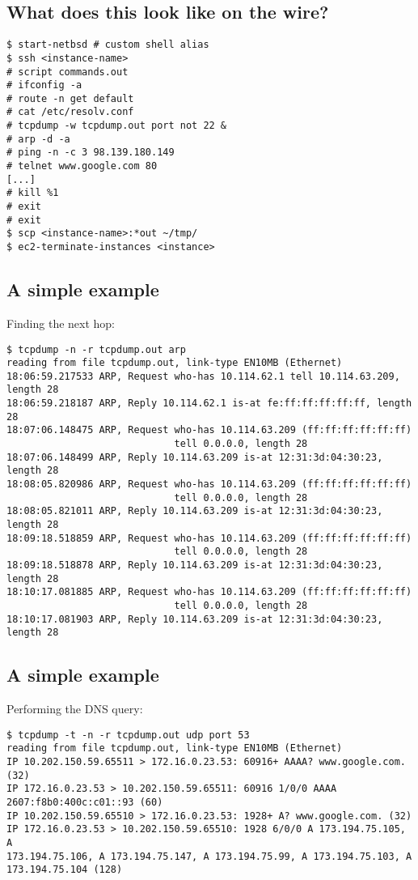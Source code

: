 \documentclass[xga]{xdvislides}
\begin{document}
\subsection{What does this look like on the wire?}
\begin{verbatim}
$ start-netbsd # custom shell alias
$ ssh <instance-name>
# script commands.out
# ifconfig -a
# route -n get default
# cat /etc/resolv.conf
# tcpdump -w tcpdump.out port not 22 &
# arp -d -a
# ping -n -c 3 98.139.180.149
# telnet www.google.com 80
[...]
# kill %1
# exit
# exit
$ scp <instance-name>:*out ~/tmp/
$ ec2-terminate-instances <instance>
\end{verbatim}

\subsection{A simple example}
Finding the next hop:
\begin{verbatim}
$ tcpdump -n -r tcpdump.out arp
reading from file tcpdump.out, link-type EN10MB (Ethernet)
18:06:59.217533 ARP, Request who-has 10.114.62.1 tell 10.114.63.209, length 28
18:06:59.218187 ARP, Reply 10.114.62.1 is-at fe:ff:ff:ff:ff:ff, length 28
18:07:06.148475 ARP, Request who-has 10.114.63.209 (ff:ff:ff:ff:ff:ff)
                             tell 0.0.0.0, length 28
18:07:06.148499 ARP, Reply 10.114.63.209 is-at 12:31:3d:04:30:23, length 28
18:08:05.820986 ARP, Request who-has 10.114.63.209 (ff:ff:ff:ff:ff:ff)
                             tell 0.0.0.0, length 28
18:08:05.821011 ARP, Reply 10.114.63.209 is-at 12:31:3d:04:30:23, length 28
18:09:18.518859 ARP, Request who-has 10.114.63.209 (ff:ff:ff:ff:ff:ff)
                             tell 0.0.0.0, length 28
18:09:18.518878 ARP, Reply 10.114.63.209 is-at 12:31:3d:04:30:23, length 28
18:10:17.081885 ARP, Request who-has 10.114.63.209 (ff:ff:ff:ff:ff:ff)
                             tell 0.0.0.0, length 28
18:10:17.081903 ARP, Reply 10.114.63.209 is-at 12:31:3d:04:30:23, length 28
\end{verbatim}

\subsection{A simple example}
Performing the DNS query:
\begin{verbatim}
$ tcpdump -t -n -r tcpdump.out udp port 53
reading from file tcpdump.out, link-type EN10MB (Ethernet)
IP 10.202.150.59.65511 > 172.16.0.23.53: 60916+ AAAA? www.google.com. (32)
IP 172.16.0.23.53 > 10.202.150.59.65511: 60916 1/0/0 AAAA 2607:f8b0:400c:c01::93 (60)
IP 10.202.150.59.65510 > 172.16.0.23.53: 1928+ A? www.google.com. (32)
IP 172.16.0.23.53 > 10.202.150.59.65510: 1928 6/0/0 A 173.194.75.105, A
173.194.75.106, A 173.194.75.147, A 173.194.75.99, A 173.194.75.103, A 173.194.75.104 (128)
\end{verbatim}
\end{document}
